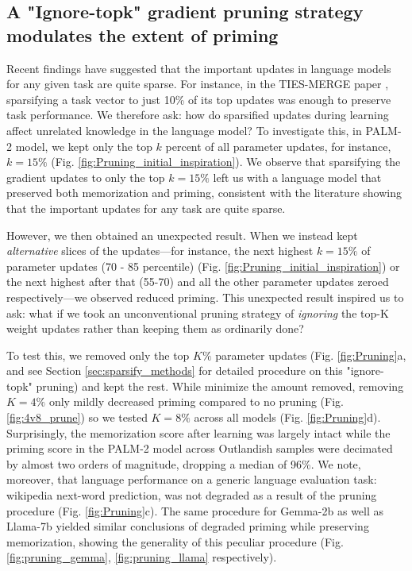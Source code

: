\documentclass[11pt, a4paper, logo, copyright]{googledeepmind}
\theoremstyle{plain}
\theoremstyle{definition}
\theoremstyle{remark}
\begin{document}
\subsection{A "Ignore-topk" gradient pruning strategy modulates the extent of priming}
\label{sec:pruning}

Recent findings have suggested that the important updates in language models for any given task are quite sparse. For instance, in the TIES-MERGE paper \citep{ties_merge}, sparsifying a task vector to just 10\% of its top updates was enough to preserve task performance. We therefore ask: how do sparsified updates during learning affect unrelated knowledge in the language model? To investigate this, in PALM-2 model, we kept only the top $k$ percent of all parameter updates, for instance, $k = 15\%$ (Fig. \ref{fig:Pruning_initial_inspiration}). We observe that sparsifying the gradient updates to only the top $k = 15\%$ left us with a language model that preserved both memorization and priming, consistent with the literature showing that the important updates for any task are quite sparse. 

However, we then obtained an unexpected result. When we instead kept \textit{alternative} slices of the updates---for instance, the next highest $k = 15\%$ of parameter updates (70 - 85 percentile) (Fig. \ref{fig:Pruning_initial_inspiration}) or the next highest after that (55-70) and all the other parameter updates zeroed respectively---we observed reduced priming. This unexpected result inspired us to ask: what if we took an unconventional pruning strategy of \textit{ignoring} the top-K weight updates rather than keeping them as ordinarily done? 

To test this, we removed only the top $K\%$ parameter updates (Fig. \ref{fig:Pruning}a, and see Section \ref{sec:sparsify_methods} for detailed procedure on this "ignore-topk" pruning) and kept the rest. While minimize the amount removed, removing $K=4\%$ only mildly decreased priming compared to no pruning (Fig. \ref{fig:4v8_prune}) so we tested $K=8\%$ across all models (Fig. \ref{fig:Pruning}d). Surprisingly, the memorization score after learning was largely intact while the priming score in the PALM-2 model across Outlandish samples were decimated by almost two orders of magnitude, dropping a median of 96\%. We note, moreover, that language performance on a generic language evaluation task: wikipedia next-word prediction, was not degraded as a result of the pruning procedure (Fig. \ref{fig:Pruning}c). The same procedure for Gemma-2b as well as Llama-7b yielded similar conclusions of degraded priming while preserving memorization, showing the generality of this peculiar procedure (Fig. \ref{fig:pruning_gemma}, \ref{fig:pruning_llama} respectively).
\end{document}
